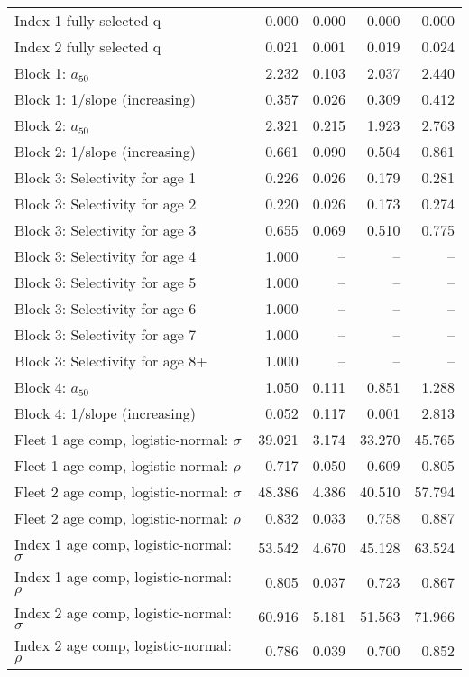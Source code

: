 \documentclass[
]{article}
\begin{document}
\begin{landscape}
\begin{longtable}[t]{lrrrr}
\endfoot
\bottomrule
\endlastfoot
Index 1 fully selected q & 0.000 & 0.000 & 0.000 & 0.000\\
Index 2 fully selected q & 0.021 & 0.001 & 0.019 & 0.024\\
Block 1: $a_{50}$ & 2.232 & 0.103 & 2.037 & 2.440\\
Block 1: 1/slope (increasing) & 0.357 & 0.026 & 0.309 & 0.412\\
Block 2: $a_{50}$ & 2.321 & 0.215 & 1.923 & 2.763\\
\addlinespace
Block 2: 1/slope (increasing) & 0.661 & 0.090 & 0.504 & 0.861\\
Block 3: Selectivity for age 1 & 0.226 & 0.026 & 0.179 & 0.281\\
Block 3: Selectivity for age 2 & 0.220 & 0.026 & 0.173 & 0.274\\
Block 3: Selectivity for age 3 & 0.655 & 0.069 & 0.510 & 0.775\\
Block 3: Selectivity for age 4 & 1.000 & -- & -- & --\\
\addlinespace
Block 3: Selectivity for age 5 & 1.000 & -- & -- & --\\
Block 3: Selectivity for age 6 & 1.000 & -- & -- & --\\
Block 3: Selectivity for age 7 & 1.000 & -- & -- & --\\
Block 3: Selectivity for age 8+ & 1.000 & -- & -- & --\\
Block 4: $a_{50}$ & 1.050 & 0.111 & 0.851 & 1.288\\
\addlinespace
Block 4: 1/slope (increasing) & 0.052 & 0.117 & 0.001 & 2.813\\
Fleet 1 age comp, logistic-normal: $\sigma$ & 39.021 & 3.174 & 33.270 & 45.765\\
Fleet 1 age comp, logistic-normal: $\rho$ & 0.717 & 0.050 & 0.609 & 0.805\\
Fleet 2 age comp, logistic-normal: $\sigma$ & 48.386 & 4.386 & 40.510 & 57.794\\
Fleet 2 age comp, logistic-normal: $\rho$ & 0.832 & 0.033 & 0.758 & 0.887\\
\addlinespace
Index 1 age comp, logistic-normal: $\sigma$ & 53.542 & 4.670 & 45.128 & 63.524\\
Index 1 age comp, logistic-normal: $\rho$ & 0.805 & 0.037 & 0.723 & 0.867\\
Index 2 age comp, logistic-normal: $\sigma$ & 60.916 & 5.181 & 51.563 & 71.966\\
Index 2 age comp, logistic-normal: $\rho$ & 0.786 & 0.039 & 0.700 & 0.852\\*
\end{longtable}
\end{landscape}
\end{document}
